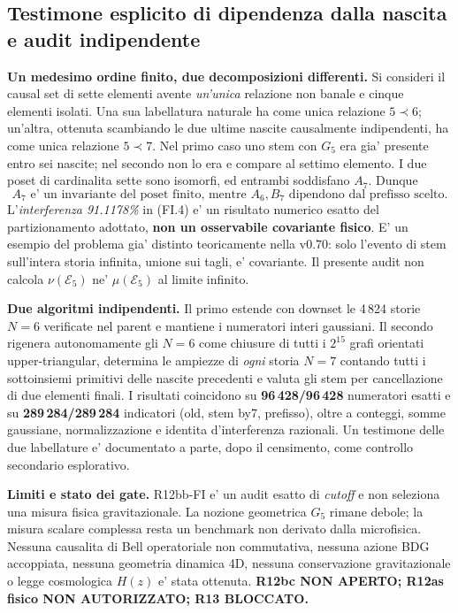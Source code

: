\documentclass[11pt,a4paper]{article}
\begin{document}
\clearpage
\subsection*{Testimone esplicito di dipendenza dalla nascita e audit indipendente}
\textbf{Un medesimo ordine finito, due decomposizioni differenti.} Si consideri il causal set di sette elementi avente \emph{un'unica} relazione non banale e cinque elementi isolati. Una sua labellatura naturale ha come unica relazione $5\prec6$; un'altra, ottenuta scambiando le due ultime nascite causalmente indipendenti, ha come unica relazione $5\prec7$. Nel primo caso uno stem con $G_5$ era gia' presente entro sei nascite; nel secondo non lo era e compare al settimo elemento. I due poset di cardinalita sette sono isomorfi, ed entrambi soddisfano $A_7$. Dunque
\begin{equation}
 \boxed{A_7\text{ e' un invariante del poset finito, mentre }A_6,B_7
 \text{ dipendono dal prefisso scelto.}}\tag{FI.5}
\end{equation}
L'\emph{interferenza 91.1178\%} in (FI.4) e' un risultato numerico esatto del partizionamento adottato, \textbf{non un osservabile covariante fisico}. E' un esempio del problema gia' distinto teoricamente nella v0.70: solo l'evento di stem sull'intera storia infinita, unione sui tagli, e' covariante. Il presente audit non calcola $\nu(\mathcal E_5)$ ne' $\mu(\mathcal E_5)$ al limite infinito.

\textbf{Due algoritmi indipendenti.} Il primo estende con downset le 4\,824 storie $N=6$ verificate nel parent e mantiene i numeratori interi gaussiani. Il secondo rigenera autonomamente gli $N=6$ come chiusure di tutti i $2^{15}$ grafi orientati upper-triangular, determina le ampiezze di \emph{ogni} storia $N=7$ contando tutti i sottoinsiemi primitivi delle nascite precedenti e valuta gli stem per cancellazione di due elementi finali. I risultati coincidono su \textbf{96\,428/96\,428} numeratori esatti e su \textbf{289\,284/289\,284} indicatori (old, stem by7, prefisso), oltre a conteggi, somme gaussiane, normalizzazione e identita d'interferenza razionali. Un testimone delle due labellature e' documentato a parte, dopo il censimento, come controllo secondario esplorativo.

\textbf{Limiti e stato dei gate.} R12bb-FI e' un audit esatto di \emph{cutoff} e non seleziona una misura fisica gravitazionale. La nozione geometrica $G_5$ rimane debole; la misura scalare complessa resta un benchmark non derivato dalla microfisica. Nessuna causalita di Bell operatoriale non commutativa, nessuna azione BDG accoppiata, nessuna geometria dinamica 4D, nessuna conservazione gravitazionale o legge cosmologica $H(z)$ e' stata ottenuta. \textbf{R12bc NON APERTO; R12as fisico NON AUTORIZZATO; R13 BLOCCATO.}
\end{document}
